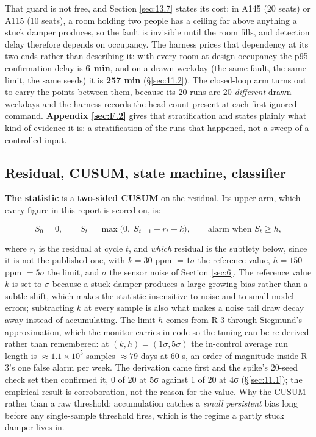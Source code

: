 That guard is not free, and Section \ref{sec:13.7} states its cost: in A145 (20 seats) or A115 (10 seats), a
room holding two people has a ceiling far above anything a stuck damper produces, so the fault is
invisible until the room fills, and detection delay therefore depends on occupancy. The harness
prices that dependency at its two ends rather than describing it: with every room at design occupancy
the p95 confirmation delay is \textbf{6 min}, and on a drawn weekday (the same fault, the same
limit, the same seeds) it is \textbf{257 min} (§\ref{sec:11.2}). The closed-loop arm turns out to carry the
points between them, because its 20 runs are 20 \emph{different} drawn weekdays and the harness
records the head count present at each first ignored command. \textbf{Appendix \ref{sec:F.2}} gives that
stratification and states plainly what kind of evidence it is: a stratification of the runs that
happened, not a sweep of a controlled input.

\subsection{Residual, CUSUM, state machine, classifier}\label{sec:7.3}

\textbf{The statistic} is a \textbf{two-sided CUSUM} on the residual. Its upper arm, which every
figure in this report is scored on, is:

\[ S_0 = 0, \qquad S_t = \max\!\big(0,\; S_{t-1} + r_t - k\big), \qquad \text{alarm when } S_t \ge h, \]

where $r_t$ is the residual at cycle $t$, and \emph{which} residual is the subtlety below, since
it is not the published one, with $k = 30$ ppm $= 1\sigma$ the reference value, $h = 150$ ppm
$= 5\sigma$ the limit, and $\sigma$ the sensor noise of Section \ref{sec:6}. The reference value $k$ is set to
$\sigma$ because a stuck damper produces a large growing bias rather than a subtle shift, which
makes the statistic insensitive to noise and to small model errors; subtracting $k$ at every sample
is also what makes a noise tail draw decay away instead of accumulating. The limit $h$ comes from
R-3 through Siegmund's approximation, which the monitor carries in code so the tuning can be
re-derived rather than remembered: at $(k,h) = (1\sigma, 5\sigma)$ the in-control average run length
is $\approx 1.1\times10^{5}$ samples $\approx 79$ days at 60 s, an order of magnitude inside R-3's
one false alarm per week. The derivation came first and the spike's 20-seed check set then
confirmed it, 0 of 20 at 5σ against 1 of 20 at 4σ (§\ref{sec:11.1}); the empirical result is
corroboration, not the reason for the value. Why the CUSUM rather than a raw threshold:
accumulation catches a
\emph{small persistent} bias long before any single-sample threshold fires, which is the regime a
partly stuck damper lives in.

